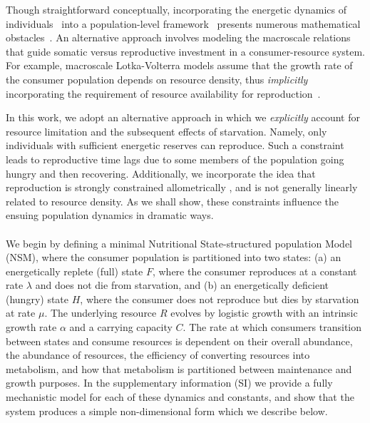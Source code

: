 \documentclass{pnastwo}
\begin{document}
\begin{article}
Though straightforward conceptually, incorporating the energetic dynamics of individuals~\cite{Kooi2000} into a population-level framework~\cite{Kooi2000,Sousa:2010ez} presents numerous mathematical obstacles~\cite{Diekmann:2010da}.
An alternative approach involves modeling the macroscale relations that guide somatic versus reproductive investment in a consumer-resource system.
For example, macroscale Lotka-Volterra models assume that the growth rate of the consumer population depends on resource density, thus \emph{implicitly} incorporating the requirement of resource availability for reproduction~\cite{murdoch:2003}.

In this work, we adopt an alternative approach in which we \emph{explicitly} account for resource limitation and the subsequent effects of starvation.
Namely, only individuals with sufficient energetic reserves can reproduce.
Such a constraint leads to reproductive time lags due to some members of the population going hungry and then recovering.
Additionally, we incorporate the idea that reproduction is strongly constrained allometrically \cite{Kempes:2012hy}, and is not generally linearly related to resource density.
As we shall show, these constraints influence the ensuing population dynamics in dramatic ways.
\\



\\
We begin by defining a minimal Nutritional State-structured population Model (NSM), where the consumer population is partitioned into two states: (a) an energetically replete (full) state $F$, where the consumer reproduces at a constant rate $\lambda$ and does not die from starvation, and (b) an energetically deficient (hungry) state $H$, where the consumer does not reproduce but dies by starvation at rate $\mu$. The underlying resource $R$ evolves by logistic growth with an intrinsic growth rate $\alpha$ and a carrying capacity $C$. The rate at which consumers transition between states and consume resources is dependent on their overall abundance, the abundance of resources, the efficiency of converting resources into metabolism, and how that metabolism is partitioned between maintenance and growth purposes. In the supplementary information (SI) we provide a fully mechanistic model for each of these dynamics and constants, and show that the system produces a simple non-dimensional form which we describe below.


\end{article}
\end{document}
